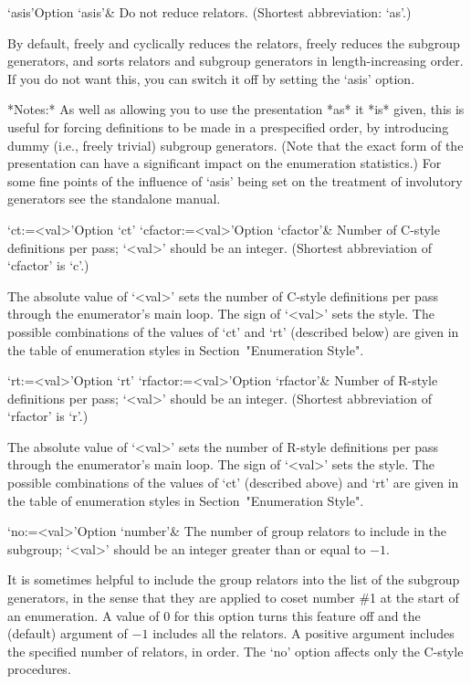 \enditems


\beginitems
\>`asis'{Option `asis'}&
Do not reduce relators. (Shortest abbreviation: `as'.)

By default, {\ACE} freely  and cyclically reduces the relators, freely
reduces  the  subgroup generators,  and  sorts  relators and  subgroup
generators in length-increasing  order.  If you do not  want this, you
can switch it off by setting the `asis' option.

*Notes:* As well as allowing you  to use the presentation *as* it *is*
given,  this  is  useful for  forcing  definitions  to  be made  in  a
prespecified  order,  by  introducing  dummy  (i.e.,  freely  trivial)
subgroup generators.   (Note that the  exact form of  the presentation
can  have a significant  impact on  the enumeration  statistics.)  For
some fine points of the influence of `asis' being set on the treatment
of involutory generators see the {\ACE} standalone manual.

\>`ct:=<val>'{Option `ct'}
\>`cfactor:=<val>'{Option `cfactor'}&
Number of C-style definitions per pass; `<val>' should be an  integer. 
(Shortest abbreviation of `cfactor' is `c'.)

The absolute value of `<val>' sets the
number of C-style definitions per  pass through  the enumerator's main
loop. The sign of `<val>'  sets the  style. The possible  combinations
of the values of `ct' and  `rt'  (described below)  are  given in  the
table of  enumeration styles in Section~"Enumeration Style".

\>`rt:=<val>'{Option `rt'}
\>`rfactor:=<val>'{Option `rfactor'}&
Number of R-style definitions per pass; `<val>' should be an  integer. 
(Shortest abbreviation of `rfactor' is `r'.)

The absolute value of `<val>' sets the
number of R-style definitions per  pass through  the enumerator's main
loop. The sign of `<val>'  sets the  style. The possible  combinations
of the values of `ct' (described above)  and  `rt'  are  given in  the
table of  enumeration styles in Section~"Enumeration Style".

\>`no:=<val>'{Option `number'}&
The number of group relators to include in the subgroup;  
`<val>' should be an integer greater than or equal to $-1$.

It is sometimes helpful to include the group relators into the list of
the subgroup generators,  in the sense that they  are applied to coset
number  \#1 at the  start of  an enumeration.  A value  of 0  for this
option  turns this  feature off  and  the (default)  argument of  $-1$
includes all the relators.  A positive argument includes the specified
number of relators, in order. The `no' option affects only the C-style
procedures.

